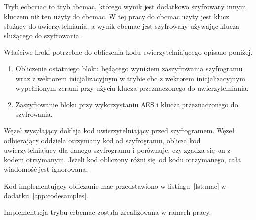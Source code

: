 Tryb \gls{ecbcmac} to tryb \gls{cbcmac}, którego wynik jest dodatkowo szyfrowany innym kluczem niż ten użyty do \gls{cbcmac}. W tej pracy do \gls{cbcmac} użyty jest klucz służący do uwierzytelniania, a wynik \gls{cbcmac} jest szyfrowany używając klucza służącego do szyfrowania.

Właściwe kroki potrzebne do obliczenia kodu uwierzytelniającego opisano poniżej.

\begin{enumerate}
\item Obliczenie ostatniego bloku będącego wynikiem zaszyfrowania szyfrogramu wraz z wektorem inicjalizacyjnym w trybie \gls{cbc} z wektorem inicjalizacyjnym wypełnionym zerami przy użyciu klucza przeznaczonego do uwierzytelniania.
\item Zaszyfrowanie bloku przy wykorzystaniu AES i klucza przeznaczonego do szyfrowania.
\end{enumerate}

Węzeł wysyłający dokleja kod uwierzytelniający przed szyfrogramem. Węzeł odbierający oddziela otrzymany kod od szyfrogramu, oblicza kod uwierzytelniający dla danego szyfrogramu i porównuje, czy zgadza się on z kodem otrzymanym. Jeżeli kod obliczony różni się od kodu otrzymanego, cała wiadomość jest ignorowana.

Kod implementujący obliczanie \gls{mac} przedstawiono w listingu~\ref{lst:mac} w dodatku~\ref{app:codesamples}.

Implementacja trybu \gls{ecbcmac} została zrealizowana w ramach pracy.
